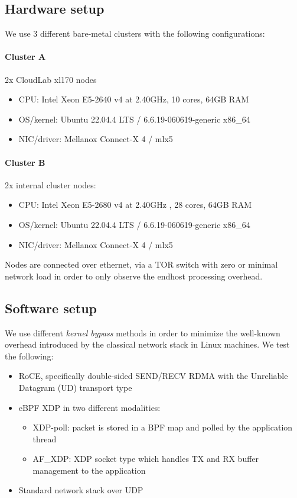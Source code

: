 \documentclass{article}
\begin{document}
\subsection*{Hardware setup}
We use 3 different bare-metal clusters with the following configurations:

\paragraph{Cluster A} 2x CloudLab xl170 nodes

\begin{itemize}
  \itemsep=-0.8mm
  \item CPU:  Intel Xeon E5-2640 v4 at 2.40GHz, 10 cores, 64GB RAM
  \item OS/kernel: Ubuntu 22.04.4 LTS / 6.6.19-060619-generic x86\_64
  \item NIC/driver: Mellanox Connect-X 4 / mlx5 
\end{itemize}

\paragraph{Cluster B} 2x internal cluster nodes: 

\begin{itemize}
  \itemsep=-0.8mm
  \item CPU:  Intel Xeon E5-2680 v4 at 2.40GHz , 28 cores, 64GB RAM
  \item OS/kernel: Ubuntu 22.04.4 LTS / 6.6.19-060619-generic x86\_64
  \item NIC/driver: Mellanox Connect-X 4 / mlx5 
\end{itemize}


Nodes are connected over ethernet, via a TOR switch with zero or minimal network load in order 
to only observe the endhost processing overhead.

\subsection*{Software setup}
We use different \textit{kernel bypass} methods in order to minimize the 
well-known overhead introduced by the classical network stack in Linux machines.
We test the following: 

\begin{itemize}
  \vspace{-0.8mm}
  \itemsep=-0.4mm
  \item RoCE, specifically double-sided SEND/RECV RDMA with the Unreliable Datagram (UD) 
  transport type
  \item eBPF XDP in two different modalities:
  \vspace{-1.8mm}
  \begin{itemize}
    \itemsep=-0.5mm
    \item XDP-poll: packet is stored in a BPF map and polled by the application
    thread
    \item AF\_XDP: XDP socket type which handles TX and RX buffer management to 
    the application
  \end{itemize}
    \item Standard network stack over UDP    
\end{itemize}
\end{document}
